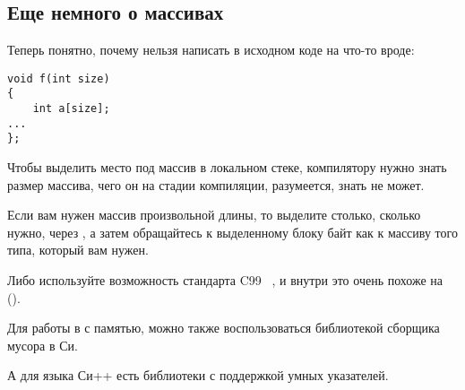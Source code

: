 \subsection{Еще немного о массивах}

Теперь понятно, почему нельзя написать в исходном коде на \CCpp что-то вроде:


\begin{lstlisting}
void f(int size)
{
    int a[size];
...
};
\end{lstlisting}

Чтобы выделить место под массив в локальном стеке, 
компилятору нужно знать размер массива, чего он на стадии компиляции, 
разумеется, знать не может.


Если вам нужен массив произвольной длины, то выделите столько, сколько нужно, через , 
а затем обращайтесь к выделенному блоку байт как к массиву того типа, который вам нужен.


Либо используйте возможность стандарта C99~ ,
и внутри это очень похоже на  ().


Для работы в с памятью, можно также воспользоваться библиотекой сборщика мусора в Си.

А для языка Си++ есть библиотеки с поддержкой умных указателей.


